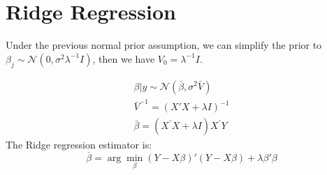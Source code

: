\section{Ridge Regression}

Under the previous normal prior assumption, we can simplify the prior to $\beta_j \sim \mathcal{N}(0, \sigma^2 \lambda^{-1} I)$,
then we have $V_0 = \lambda^{-1} I$.

\begin{align*}
    \beta | y \sim \mathcal{N}(\bar{\beta }, \sigma^2 \bar{V}) \\
    \bar{V}^{-1} = \left( X'X + \lambda I \right)^{ -1} \\
    \bar{\beta } = \left(X^{\prime} X + \lambda I \right) X^{\prime} Y
\end{align*}
The Ridge regression estimator is:
\begin{equation}
    \overline{\beta } = \arg \min_\beta (Y - X \beta )' (Y - X \beta ) + \lambda \beta' \beta
\end{equation}
